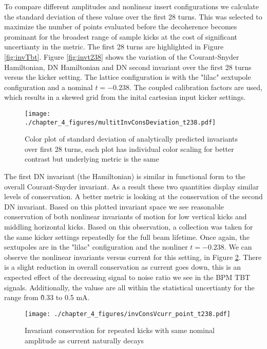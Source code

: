 To compare different amplitudes and nonlinear insert configurations we calculate the standard deviation of these valuse over the first 28 turns. This was selected to maximize the number of points evaluated before the decoherence becomes prominant for the broadest range of sample kicks at the cost of significant uncertianty in the metric. The first 28 turns are highlighted in Figure \ref{fig:invTbt}. Figure \ref{fig:invt238} shows the variation of the Courant-Snyder Hamiltonian, DN Hamiltonian and DN second invariant over the first 28 turns versus the kicker setting. The lattice configuration is with the "lilac" sextupole configuration and a nominal $t=-0.238$. The coupled calibration factors are used, which results in a skewed grid from the inital cartesian input kicker settings.

\begin{figure}
	\centering
	\texttt{[image: ./chapter\_4\_figures/multitInvConsDeviation\_t238.pdf]}
	\caption{Color plot of standard deviation of analytically predicted invariants over first 28 turns, each plot has individual color scaling for better contrast but underlying metric is the same}
	\label{fig:inv238}
\end{figure}

The first DN invariant (the Hamiltonian) is similar in functional form to the overall Courant-Snyder invariant. As a result these two quantities display similar levels of conservation. A better metric is looking at the conservation of the second DN invariant. Based on this plotted invariant space we see reasonable conservation of both nonlinear invariants of motion for low vertical kicks and middling horizontal kicks. Based on this observation, a collection was taken for the same kicker settings repeatedly for the full beam lifetime. Once again, the sextupoles are in the "lilac" configuration and the nonliner $t=-0.238$. We can observe the nonlinear invariants versus current for this setting, in Figure \ref{fig:pointCurrent}. There is a slight reduction in overall conservation as current goes down, this is an expected effect of the decreasing signal to noise ratio we see in the BPM TBT signals. Additionally, the valuse are all within the statistical uncertianty for the range from \~0.33 to 0.5 mA.

\begin{figure}
	\centering
	\texttt{[image: ./chapter\_4\_figures/invConsVcurr\_point\_t238.pdf]}
	\caption{Invariant conservation for repeated kicks with same nominal amplitude as current naturally decays}
	\label{fig:pointCurrent}
\end{figure}

